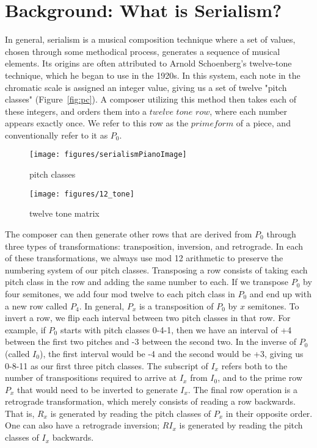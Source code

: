 \section{Background: What is Serialism?}

In general, serialism is a musical composition technique where a set of values, chosen through some methodical process, 
generates a sequence of musical elements. Its origins are often attributed to Arnold Schoenberg's twelve-tone technique, which
he began to use in the 1920s. In this system, each note in the chromatic scale is assigned an integer value, giving us a set of twelve
"pitch classes" (Figure~\ref{fig:pc}).
A composer utilizing this method then takes each of these integers, and orders them into a $twelve$ $tone$ $row$, where 
each number appears exactly once. We refer to this row as the $prime form$ of a piece, and conventionally refer 
to it as $P_0$. 

\begin{figure}
\begin{minipage}{0.6\textwidth}
	\centering
	\texttt{[image: figures/serialismPianoImage]}
	\caption{pitch classes}
	\label{fig:pc}
\end{minipage}\hfill
\begin{minipage}{0.4\textwidth}
	\centering
		\texttt{[image: figures/12\_tone]}
	\caption{twelve tone matrix}
	\label{fig:12tone}
\end{minipage}
\end{figure}


The composer can then generate other rows that are derived from $P_0$ through three types of transformations:
transposition, inversion, and retrograde. In each of these transformations, we always use mod 12 arithmetic to preserve the 
numbering system of our pitch classes. Transposing a row consists of taking each pitch class in the row and adding the same number 
to each. If we transpose $P_0$ by four semitones, we add four mod twelve to each pitch class in $P_0$ and end up with a new row 
called $P_4$. In general, $P_x$ is a transposition of $P_0$ by $x$ semitones. To invert a row, we flip each interval between two 
pitch classes in that row. For example, if $P_0$ starts with pitch classes 0-4-1, then we have an interval of +4 between the first two 
pitches and -3 between the second two. In the inverse of $P_0$ (called $I_0$), the first interval would be -4 and the second would 
be +3, giving us 0-8-11 as our first three pitch classes. The subscript of $I_x$  refers both to the number of transpositions required 
to arrive at $I_x$ from $I_0$, and to the prime row $P_x$ that would need to be inverted to generate $I_x$. The final row 
operation is a retrograde transformation, which merely consists of reading a row backwards. That is, $R_x$ is generated by reading 
the pitch classes of $P_x$ in their opposite order. One can also have a retrograde inversion; $RI_x$ is generated by reading the 
pitch classes of $I_x$ backwards.

